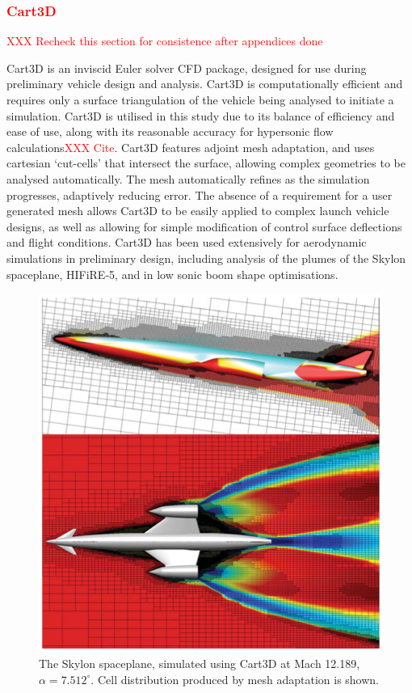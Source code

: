 \textcolor{red}{
\subsubsection{Cart3D}\label{sec:Cart3d}
}
\textcolor{red}{XXX Recheck this section for consistence after appendices done}

Cart3D is an inviscid Euler solver CFD package, designed for use during preliminary vehicle design and analysis\cite{Almosnino2016}. Cart3D is computationally efficient and requires only a surface triangulation of the vehicle being analysed to initiate a simulation. Cart3D is utilised in this study due to its balance of efficiency and ease of use, along with its reasonable accuracy for hypersonic flow calculations\textcolor{red}{XXX Cite}. Cart3D features adjoint mesh adaptation, and uses cartesian `cut-cells' that intersect the surface, allowing complex geometries to be analysed automatically. The mesh automatically refines as the simulation progresses, adaptively reducing error. The absence of a requirement for a user generated mesh allows Cart3D to be easily applied to complex launch vehicle designs, as well as allowing for simple modification of control surface deflections and flight conditions. 
Cart3D has been used extensively for aerodynamic simulations in preliminary design, including analysis of the plumes of the Skylon spaceplane\cite{Mehta2016}, HIFiRE-5\cite{Kimmel2010}, and in low sonic boom shape optimisations\cite{Aftosmis2011}. 
\begin{figure}[ht]
\centering
\includegraphics[width=0.6\linewidth]{figures/2_literature-review/Skylon-Cart3D}
\caption{The Skylon spaceplane, simulated using Cart3D at Mach 12.189, $\alpha=7.512^\circ$\cite{Mehta2016}. Cell distribution produced by mesh adaptation is shown.}
\label{fig:Skylon-Cart3D}
\end{figure}
